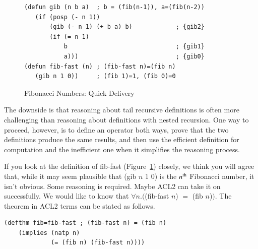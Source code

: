 \begin{figure}
\begin{center}
\begin{code}
\begin{verbatim}
(defun gib (n b a)  ; b = (fib(n-1)), a=(fib(n-2))
   (if (posp (- n 1))
       (gib (- n 1) (+ b a) b)            ; {gib2}
       (if (= n 1)
           b                              ; {gib1}
           a)))                           ; {gib0}
(defun fib-fast (n) ; (fib-fast n)=(fib n)
   (gib n 1 0))     ; (fib 1)=1, (fib 0)=0
\end{verbatim}
\end{code}
\end{center}
\caption{Fibonacci Numbers: Quick Delivery}
\label{fig:gib-defun}
\end{figure}

The downside is that reasoning
about tail recursive
definitions is often more challenging than reasoning about definitions
with nested recursion. One way to proceed, however,
is to define an operator both ways, prove that the two definitions
produce the same results, and then use the efficient definition
for computation and the inefficient one when it
simplifies the reasoning process.

If you look at the definition of \textsf{fib-fast} (Figure~\ref{fig:gib-defun})
closely, we think you will agree that, while it may seem plausible
that \textsf{(gib $n$ $1$ $0$)} is the $n^\textnormal{th}$ Fibonacci number,
it isn't obvious.
Some reasoning is required.
Maybe ACL2 can take it on successfully.
We would like to know that $\forall n.($\textsf{(fib-fast $n$)} $=$ \textsf{(fib $n$)}$)$.
The theorem in ACL2 terms can be stated as follows.
\begin{center}
\begin{code}
\begin{verbatim}
(defthm fib=fib-fast ; (fib-fast n) = (fib n)
    (implies (natp n)
             (= (fib n) (fib-fast n))))
\end{verbatim}
\end{code}
\end{center}

